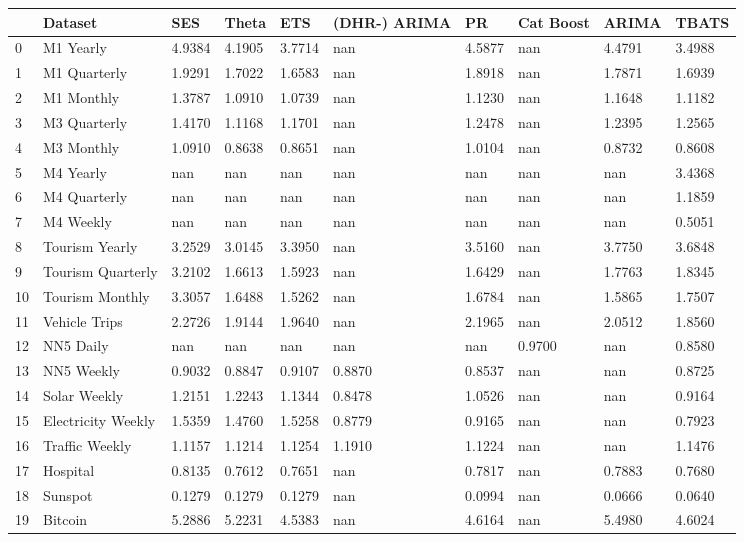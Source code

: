 \begin{tabular}{llllllllll}
\toprule
 & Dataset & SES & Theta & ETS & (DHR-) ARIMA & PR & Cat Boost & ARIMA & TBATS \\
\midrule
0 & M1 Yearly & 4.9384 & 4.1905 & 3.7714 & nan & 4.5877 & nan & 4.4791 & 3.4988 \\
1 & M1 Quarterly & 1.9291 & 1.7022 & 1.6583 & nan & 1.8918 & nan & 1.7871 & 1.6939 \\
2 & M1 Monthly & 1.3787 & 1.0910 & 1.0739 & nan & 1.1230 & nan & 1.1648 & 1.1182 \\
3 & M3 Quarterly & 1.4170 & 1.1168 & 1.1701 & nan & 1.2478 & nan & 1.2395 & 1.2565 \\
4 & M3 Monthly & 1.0910 & 0.8638 & 0.8651 & nan & 1.0104 & nan & 0.8732 & 0.8608 \\
5 & M4 Yearly & nan & nan & nan & nan & nan & nan & nan & 3.4368 \\
6 & M4 Quarterly & nan & nan & nan & nan & nan & nan & nan & 1.1859 \\
7 & M4 Weekly & nan & nan & nan & nan & nan & nan & nan & 0.5051 \\
8 & Tourism Yearly & 3.2529 & 3.0145 & 3.3950 & nan & 3.5160 & nan & 3.7750 & 3.6848 \\
9 & Tourism Quarterly & 3.2102 & 1.6613 & 1.5923 & nan & 1.6429 & nan & 1.7763 & 1.8345 \\
10 & Tourism Monthly & 3.3057 & 1.6488 & 1.5262 & nan & 1.6784 & nan & 1.5865 & 1.7507 \\
11 & Vehicle Trips & 2.2726 & 1.9144 & 1.9640 & nan & 2.1965 & nan & 2.0512 & 1.8560 \\
12 & NN5 Daily & nan & nan & nan & nan & nan & 0.9700 & nan & 0.8580 \\
13 & NN5 Weekly & 0.9032 & 0.8847 & 0.9107 & 0.8870 & 0.8537 & nan & nan & 0.8725 \\
14 & Solar Weekly & 1.2151 & 1.2243 & 1.1344 & 0.8478 & 1.0526 & nan & nan & 0.9164 \\
15 & Electricity Weekly & 1.5359 & 1.4760 & 1.5258 & 0.8779 & 0.9165 & nan & nan & 0.7923 \\
16 & Traffic Weekly & 1.1157 & 1.1214 & 1.1254 & 1.1910 & 1.1224 & nan & nan & 1.1476 \\
17 & Hospital & 0.8135 & 0.7612 & 0.7651 & nan & 0.7817 & nan & 0.7883 & 0.7680 \\
18 & Sunspot & 0.1279 & 0.1279 & 0.1279 & nan & 0.0994 & nan & 0.0666 & 0.0640 \\
19 & Bitcoin & 5.2886 & 5.2231 & 4.5383 & nan & 4.6164 & nan & 5.4980 & 4.6024 \\

\end{tabular}
